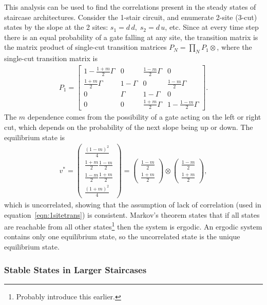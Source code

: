 This analysis can be used to find the correlations present in the steady states of staircase architectures. Consider the 1-stair circuit, and enumerate 2-site (3-cut) states by the slope at the 2 sites: $s_1 = d\,d,\; s_2 = d\,u$, etc. Since at every time step there is an equal probability of a gate falling at any site, the transition matrix is the matrix product of single-cut transition matrices $P_{N} = \prod_NP_{1}\otimes$, where the single-cut transition matrix is 
\begin{align}
P_1 = \begin{bmatrix}
1-\frac{1+m}{2}\Gamma & 0      & \frac{1-m}{2}\Gamma & 0\\
\frac{1+m}{2}\Gamma & 1-\Gamma & 0                   & \frac{1-m}{2}\Gamma\\
0                   & \Gamma   & 1-\Gamma            & 0\\
0                   & 0        & \frac{1+m}{2}\Gamma & 1 - \frac{1-m}{2}\Gamma
\end{bmatrix}. \label{eqn:1sitetrans}
\end{align}
The $m$ dependence comes from the possibility of a gate acting on the left or right cut, which depends on the probability of the next slope being up or down.
The equilibrium state is
\begin{align}
v^* = \begin{pmatrix}
\frac{(1-m)^2}{4} \\ 
\frac{1+m}{2}\frac{1-m}{2} \\
\frac{1-m}{2}\frac{1+m}{2} \\
\frac{(1+m)^2}{4}
\end{pmatrix} = \begin{pmatrix}
\frac{1-m}{2} \\ \frac{1+m}{2}
\end{pmatrix} \otimes \begin{pmatrix}
\frac{1-m}{2} \\ \frac{1+m}{2}
\end{pmatrix},
\end{align}
which is uncorrelated, showing that the assumption of lack of correlation (used in equation~\ref{eqn:1sitetrans}) is consistent. Markov's theorem states that if all states are reachable from all other states\footnote{Probably introduce this earlier.} then the system is ergodic. An ergodic system contains only one equilibrium state, so the uncorrelated state is the unique equilibrium state.

\subsubsection{Stable States in Larger Staircases} \emph{} \label{subsub:stairstate}

